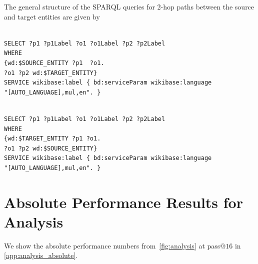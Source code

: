 \documentclass[11pt]{article}
\begin{document}
\noindent The general structure of the SPARQL queries for 2-hop paths between the source and target entities are given by

\begin{framed}
\begin{Verbatim}[fontsize=\scriptsize]

SELECT ?p1 ?p1Label ?o1 ?o1Label ?p2 ?p2Label 
WHERE
{wd:$SOURCE_ENTITY ?p1  ?o1.
?o1 ?p2 wd:$TARGET_ENTITY}
SERVICE wikibase:label { bd:serviceParam wikibase:language 
"[AUTO_LANGUAGE],mul,en". }
\end{Verbatim}
\end{framed}

\begin{framed}
\begin{Verbatim}[fontsize=\scriptsize]

SELECT ?p1 ?p1Label ?o1 ?o1Label ?p2 ?p2Label 
WHERE 
{wd:$TARGET_ENTITY ?p1 ?o1. 
?o1 ?p2 wd:$SOURCE_ENTITY} 
SERVICE wikibase:label { bd:serviceParam wikibase:language 
"[AUTO_LANGUAGE],mul,en". }
\end{Verbatim}
\end{framed}

\section{Absolute Performance Results for Analysis}\label{app:analysis_absolute_section}

We show the absolute performance numbers from~\cref{fig:analysis} at pass@$16$ in \cref{app:analysis_absolute}.
\end{document}
